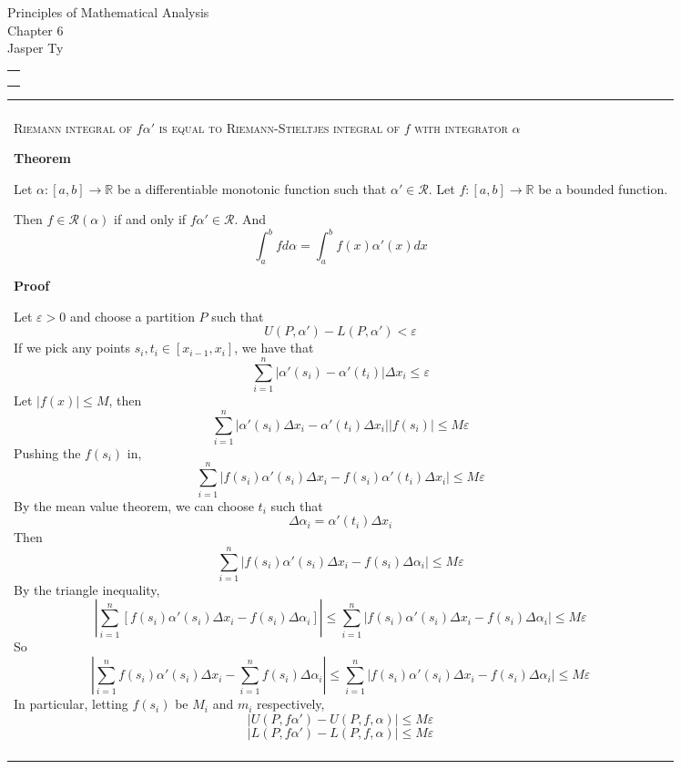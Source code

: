 \documentclass{article}
\newenvironment{myboxed}{\bigskip\noindent\begin{tabular}{|p{.975\textwidth}|}\hline \\}{\\\\\hline\end{tabular}\bigskip}
\newenvironment{mytitle}{\noindent\large\begin{flushright}}{\end{flushright}\normalsize}
\begin{document}
\begin{mytitle}
    Principles of Mathematical Analysis \\
    Chapter 6 \\
    \normalsize Jasper Ty
\end{mytitle}

\begin{myboxed}

\end{myboxed}

\begin{myboxed}
    \textsc{Riemann integral of $f \alpha'$ is equal to Riemann-Stieltjes integral of $f$ with integrator $\alpha$}
 
    \textbf{Theorem}

    Let $\alpha: [a,b] \rightarrow \mathbb{R}$ be a differentiable monotonic function such that $\alpha' \in \mathscr{R}$. Let $f: [a, b] \rightarrow \mathbb{R}$ be a bounded function. 

    Then $f \in \mathscr{R}(\alpha)$ if and only if $f\alpha' \in \mathscr{R}$. And
    \[\int_a^b fd\alpha = \int_a^b f(x) \alpha'(x) dx\]

    \textbf{Proof}

    Let $\varepsilon > 0$ and choose a partition $P$ such that
    \[U(P, \alpha') - L(P, \alpha') < \varepsilon\]
    If we pick any points $s_i, t_i \in [x_{i-1}, x_i]$, we have that
    \[\sum_{i=1}^n |\alpha'(s_i) - \alpha'(t_i)|\Delta x_i \leq \varepsilon \]
    Let $|f(x)| \leq M$, then
    \[\sum_{i=1}^n |\alpha'(s_i) \Delta x_i - \alpha'(t_i) \Delta x_i||f(s_i)| \leq  M\varepsilon \]
    Pushing the $f(s_i)$ in,
    \[\sum_{i=1}^n |f(s_i)\alpha'(s_i) \Delta x_i - f(s_i)\alpha'(t_i) \Delta x_i| \leq  M\varepsilon \]
    By the mean value theorem, we can choose $t_i$ such that
    \[\Delta\alpha_i = \alpha'(t_i)\Delta x_i\]
    Then
    \[\sum_{i=1}^n |f(s_i)\alpha'(s_i) \Delta x_i - f(s_i)\Delta\alpha_i| \leq  M\varepsilon \]
    By the triangle inequality,
    \[\left| \sum_{i=1}^n [f(s_i)\alpha'(s_i) \Delta x_i - f(s_i)\Delta\alpha_i] \right| \leq \sum_{i=1}^n |f(s_i)\alpha'(s_i) \Delta x_i - f(s_i)\Delta\alpha_i| \leq  M\varepsilon \]
    So 
    \[\left| \sum_{i=1}^n f(s_i)\alpha'(s_i) \Delta x_i - \sum_{i=1}^n f(s_i)\Delta\alpha_i \right| \leq \sum_{i=1}^n |f(s_i)\alpha'(s_i) \Delta x_i - f(s_i)\Delta\alpha_i| \leq  M\varepsilon \]
    In particular, letting $f(s_i)$ be $M_i$ and $m_i$ respectively,
    \[|U(P, f\alpha') - U(P, f, \alpha)| \leq M\varepsilon\]
    \[|L(P, f\alpha') - L(P, f, \alpha)| \leq M\varepsilon\]

\end{myboxed}
\end{document}

